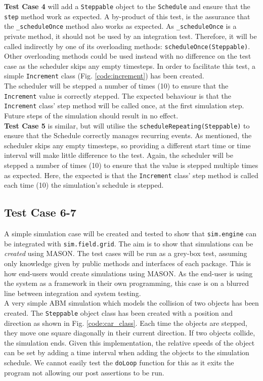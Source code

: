 \documentclass[11pt]{article}
\begin{document}
\textbf{Test Case 4} will add a \texttt{Steppable} object to the \texttt{Schedule} and ensure that the \texttt{step} method work as expected.
A by-product of this test, is the assurance that the \texttt{\_scheduleOnce} method also works as expected.
As \texttt{\_scheduleOnce} is a private method, it should not be used by an integration test.
Therefore, it will be called indirectly by one of its overloading methods: \texttt{scheduleOnce(Steppable)}.
Other overloading methods could be used instead with no difference on the test case as the scheduler skips any empty timesteps.
In order to facilitate this test, a simple \texttt{Increment} class (Fig. \ref{code:increment}) has been created.
\\

The scheduler will be stepped a number of times (10) to ensure that the \texttt{Increment} value is correctly stepped.
The expected behaviour is that the \texttt{Increment} class' step method will be called once, at the first simulation step.
Future steps of the simulation should result in no effect.
\\

\textbf{Test Case 5} is similar, but will utilise the \texttt{scheduleRepeating(Steppable)} to ensure that the Schedule correctly manages recurring events.
As mentioned, the scheduler skips any empty timesteps, so providing a different start time or time interval will make little difference to the test.
Again, the scheduler will be stepped a number of times (10) to ensure that the value is stepped multiple times as expected.
Here, the expected is that the \texttt{Increment} class' step method is called each time (10) the simulation's schedule is stepped.

\subsection{Test Case 6-7}
A simple simulation case will be created and tested to show that \texttt{sim.engine} can be integrated with \texttt{sim.field.grid}.
The aim is to show that simulations can be \textit{created} using MASON.
The test cases will be run as a grey-box test, assuming only knowledge given by public methods and interfaces of each package.
This is how end-users would create simulations using MASON.
As the end-user is using the system as a framework in their own programming, this case is on a blurred line between integration and system testing.
\\

A very simple ABM simulation which models the collision of two objects has been created.
The \texttt{Steppable} object class has been created with a position and direction  as shown in Fig. \ref{code:car_class}.
Each time the objects are stepped, they move one square diagonally in their current direction.
If two objects collide, the simulation ends.
Given this implementation, the relative speeds of the object can be set by adding a time interval when adding the objects to the simulation schedule.
We cannot easily test the \texttt{doLoop} function for this as it exits the program not allowing our post assertions to be run.
\\
\end{document}
